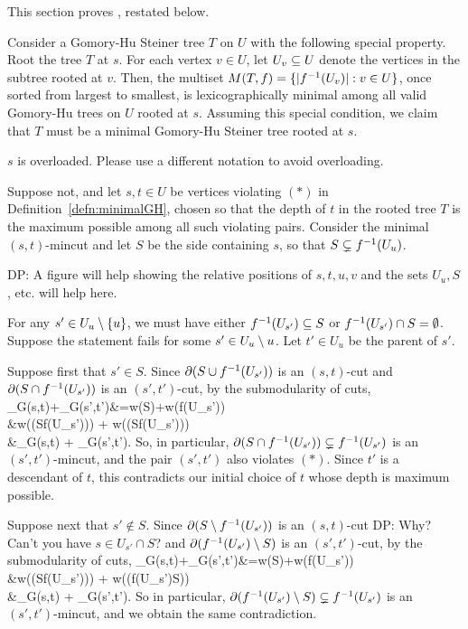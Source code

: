 This section proves , restated below.
\Rooted*

Consider a Gomory-Hu Steiner tree $T$ on $U$ with the following special property. Root the tree $T$ at $s$. For each vertex $v\in U$, let $U_v\subseteq U$ denote the vertices in the subtree rooted at $v$. Then, the multiset $M(T,f)=\{ |f^{-1}(U_v)| : v\in U\}$, once sorted from largest to smallest, is lexicographically minimal among all valid Gomory-Hu trees on $U$ rooted at $s$. Assuming this special condition, we claim that $T$ must be a minimal Gomory-Hu Steiner tree rooted at $s$.

\alert{$s$ is overloaded. Please use a different notation to avoid overloading.}

Suppose not, and let $s,t\in U$ be vertices violating $(*)$ in Definition~\ref{defn:minimalGH}, chosen so that the depth of $t$ in the rooted tree $T$ is the maximum possible among all such violating pairs. Consider the minimal $(s,t)$-mincut and let $S$ be the side containing $s$, so that $S\subsetneq f^{-1}(U_u)$.

\alert{DP: A figure will help showing the relative positions of $s, t, u, v$ and the sets $U_u, S$, etc. will help here.}

\BCL{}
For any $s'\in U_u\setminus \{u\}$, we must have either $f^{-1}(U_{s'})\subseteq S$ or $f^{-1}(U_{s'})\cap S=\emptyset$.
\ECL
\BP
Suppose the statement fails for some $s'\in U_u\setminus u$. Let $t'\in U_u$ be the parent of $s'$.

Suppose first that $s'\in S$. Since $\partial(S\cup f^{-1}(U_{s'}))$ is an $(s,t)$-cut and $\partial(S\cap f^{-1}(U_{s'}))$ is an $(s',t')$-cut, by the submodularity of cuts,
\BAL
\mincut_G(s,t)+\mincut_G(s',t')&=w(\pt S)+w(\pt f\inv(U_{s'})) 
\\&\ge w(\pt(S\cup f\inv(U_{s'}))) + w(\pt(S\cap f\inv(U_{s'}))) 
\\&\ge \mincut_G(s,t) + \mincut_G(s',t').
\EAL
So, in particular, $\partial(S\cap f^{-1}(U_{s'})) \subsetneq f^{-1}(U_{s'})$ is an $(s',t')$-mincut, and the pair $(s',t')$ also violates $(*)$. Since $t'$ is a descendant of $t$, this contradicts our initial choice of $t$ whose depth is maximum possible. 

Suppose next that $s'\notin S$. Since $\partial(S\setminus f^{-1}(U_{s'}))$ is an $(s,t)$-cut \alert{DP: Why? Can't you have $s\in U_{s'}\cap S$?} and $\partial(f^{-1}(U_{s'})\setminus S)$ is an $(s',t')$-cut, by the submodularity of cuts,
\BAL
\mincut_G(s,t)+\mincut_G(s',t')&=w(\pt S)+w(\pt f\inv(U_{s'})) 
\\&\ge w(\pt(S\sm f\inv(U_{s'}))) + w(\pt(f\inv(U_{s'})\sm S)) 
\\&\ge \mincut_G(s,t) + \mincut_G(s',t').
\EAL
So in particular, $\partial(f^{-1}(U_{s'})\setminus S)\subsetneq f^{-1}(U_{s'})$ is an $(s',t')$-mincut, and we obtain the same contradiction. 
\EP

